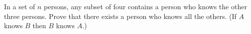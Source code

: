 In a set of $n$ persons, any subset of four contains a person who knows the other three persons. Prove that there exists a person who knows all the others. (If $A$ knows $B$ then $B$ knows $A$.)

